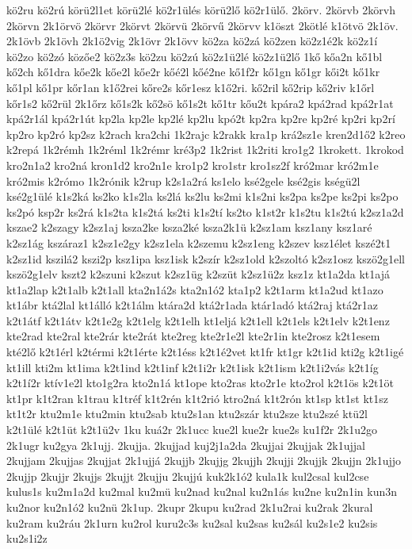 {kö2ru
kö2rú
körü2l1et
körü2lé
kö2r1ülés
körü2lő
kö2r1ülő.
2körv.
2körvb
2körvh
2körvn
2k1örvö
2körvr
2körvt
2körvü
2körvű
2körvv
k1öszt
2kötlé
k1ötvö
2k1öv.
2k1övb
2k1övh
2k1ö2vig
2k1övr
2k1övv
kö2za
kö2zá
kö2zen
kö2z1é2k
kö2z1í
kö2zo
kö2zó
közőe2
kö2z3s
kö2zu
kö2zú
kö2z1ü2lé
kö2z1ü2lő
1kő
kőa2n
kő1bl
kő2ch
kő1dra
kőe2k
kőe2l
kőe2r
kőé2l
kőé2ne
kő1f2r
kő1gn
kő1gr
kői2t
kő1kr
kő1pl
kő1pr
kőr1an
k1ő2rei
kőre2s
kőr1esz
k1ő2ri.
kő2ril
kő2rip
kő2riv
k1őrl
kőr1s2
kő2rül
2k1őrz
kő1s2k
kő2sö
kő1s2t
kő1tr
kőu2t
kpára2
kpá2rad
kpá2r1at
kpá2r1ál
kpá2r1út
kp2la
kp2le
kp2lé
kp2lu
kpó2t
kp2ra
kp2re
kp2ré
kp2ri
kp2rí
kp2ro
kp2ró
kp2sz
k2rach
kra2chi
1k2rajc
k2rakk
kra1p
krá2sz1e
kren2d1ő2
k2reo
k2repá
1k2rémh
1k2réml
1k2rémr
kré3p2
1k2rist
1k2riti
kro1g2
1krokett.
1krokod
kro2n1a2
kro2ná
kron1d2
kro2n1e
kro1p2
kro1str
kro1sz2f
kró2mar
kró2m1e
kró2mis
k2rómo
1k2rónik
k2rup
k2s1a2rá
ks1elo
ksé2gele
ksé2gis
kségü2l
ksé2g1ülé
k1s2ká
ks2ko
k1s2la
ks2lá
ks2lu
ks2mi
k1s2ni
ks2pa
ks2pe
ks2pi
ks2po
ks2pó
ksp2r
ks2rá
k1s2ta
k1s2tá
ks2ti
k1s2tí
ks2to
k1st2r
k1s2tu
k1s2tú
k2sz1a2d
kszae2
k2szagy
k2sz1aj
ksza2ke
ksza2ké
ksza2k1ü
k2sz1am
ksz1any
ksz1aré
k2sz1ág
kszáraz1
k2sz1e2gy
k2sz1ela
k2szemu
k2sz1eng
k2szev
ksz1élet
kszé2t1
k2sz1id
kszilá2
kszi2p
ksz1ipa
ksz1isk
k2szír
k2sz1old
k2szoltó
k2sz1osz
kszö2g1ell
kszö2g1elv
kszt2
k2szuni
k2szut
k2sz1üg
k2szüt
k2sz1ü2z
ksz1z
kt1a2da
kt1ajá
kt1a2lap
k2t1alb
k2t1all
kta2n1á2s
kta2n1ó2
kta1p2
k2t1arm
kt1a2ud
kt1azo
kt1ábr
ktá2lal
kt1álló
k2t1álm
ktára2d
ktá2r1ada
ktár1adó
ktá2raj
ktá2r1az
k2t1átf
k2t1átv
k2t1e2g
k2t1elg
k2t1elh
kt1eljá
k2t1ell
k2t1els
k2t1elv
k2t1enz
kte2rad
kte2ral
kte2rár
kte2rát
kte2reg
kte2r1e2l
kte2r1in
kte2rosz
k2t1esem
kté2lő
k2t1érl
k2térmi
k2t1érte
k2t1éss
k2t1é2vet
kt1fr
kt1gr
k2t1id
kti2g
k2t1igé
kt1ill
kti2m
kt1ima
k2t1ind
k2t1inf
k2t1i2r
k2t1isk
k2t1ism
k2t1i2vás
k2t1íg
k2t1í2r
ktív1e2l
kto1g2ra
kto2n1á
kt1ope
kto2ras
kto2r1e
kto2rol
k2t1ös
k2t1öt
kt1pr
k1t2ran
k1trau
k1tréf
k1t2rén
k1t2rió
ktro2ná
k1t2rón
kt1sp
kt1st
kt1sz
kt1t2r
ktu2m1e
ktu2min
ktu2sab
ktu2s1an
ktu2szár
ktu2sze
ktu2szé
ktü2l
k2t1ülé
k2t1üt
k2t1ü2v
1ku
kuá2r
2k1ucc
kue2l
kue2r
kue2s
ku1f2r
2k1u2go
2k1ugr
ku2gya
2k1ujj.
2kujja.
2kujjad
kuj2j1a2da
2kujjai
2kujjak
2k1ujjal
2kujjam
2kujjas
2kujjat
2k1ujjá
2kujjb
2kujjg
2kujjh
2kujji
2kujjk
2kujjn
2k1ujjo
2kujjp
2kujjr
2kujjs
2kujjt
2kujju
2kujjú
kuk2k1ó2
kula1k
kul2csal
kul2cse
kulus1s
ku2m1a2d
ku2mal
ku2mü
ku2nad
ku2nal
ku2n1ás
ku2ne
ku2n1in
kun3n
ku2nor
ku2n1ó2
ku2nü
2k1up.
2kupr
2kupu
ku2rad
2k1u2rai
ku2rak
2kural
ku2ram
ku2ráu
2k1urn
ku2rol
kuru2c3s
ku2sal
ku2sas
ku2sál
ku2s1e2
ku2sis
ku2s1i2z
}
